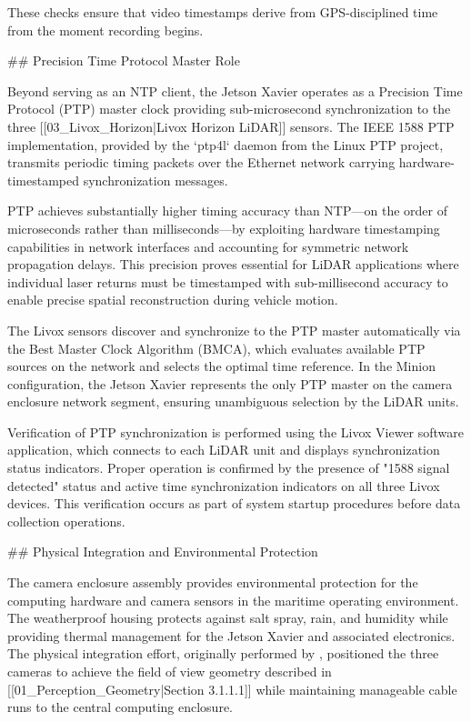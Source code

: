 \documentclass{erauthesis}
\begin{document}
These checks ensure that video timestamps derive from GPS-disciplined time from the moment recording begins.

## Precision Time Protocol Master Role

Beyond serving as an NTP client, the Jetson Xavier operates as a Precision Time Protocol (PTP) master clock providing sub-microsecond synchronization to the three [[03_Livox_Horizon|Livox Horizon LiDAR]] sensors. The IEEE 1588 PTP implementation, provided by the `ptp4l` daemon from the Linux PTP project, transmits periodic timing packets over the Ethernet network carrying hardware-timestamped synchronization messages.

PTP achieves substantially higher timing accuracy than NTP—on the order of microseconds rather than milliseconds—by exploiting hardware timestamping capabilities in network interfaces and accounting for symmetric network propagation delays. This precision proves essential for LiDAR applications where individual laser returns must be timestamped with sub-millisecond accuracy to enable precise spatial reconstruction during vehicle motion.

The Livox sensors discover and synchronize to the PTP master automatically via the Best Master Clock Algorithm (BMCA), which evaluates available PTP sources on the network and selects the optimal time reference. In the Minion configuration, the Jetson Xavier represents the only PTP master on the camera enclosure network segment, ensuring unambiguous selection by the LiDAR units.

Verification of PTP synchronization is performed using the Livox Viewer software application, which connects to each LiDAR unit and displays synchronization status indicators. Proper operation is confirmed by the presence of "1588 signal detected" status and active time synchronization indicators on all three Livox devices. This verification occurs as part of system startup procedures before data collection operations.

## Physical Integration and Environmental Protection

The camera enclosure assembly provides environmental protection for the computing hardware and camera sensors in the maritime operating environment. The weatherproof housing protects against salt spray, rain, and humidity while providing thermal management for the Jetson Xavier and associated electronics. The physical integration effort, originally performed by \cite{thompson2023}, positioned the three cameras to achieve the field of view geometry described in [[01_Perception_Geometry|Section 3.1.1.1]] while maintaining manageable cable runs to the central computing enclosure.
\end{document}
